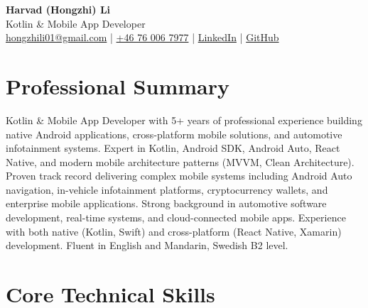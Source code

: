 \documentclass[11pt,a4paper]{article}
\begin{document}
\pagestyle{empty}

\begin{center}
{\LARGE \textbf{Harvad (Hongzhi) Li}}\\[10pt]
{\Large Kotlin \& Mobile App Developer}\\[10pt]
\textcolor{linkedinblue}{\href{mailto:hongzhili01@gmail.com}{hongzhili01@gmail.com} | \href{tel:+46760067977}{+46 76 006 7977} | \href{https://www.linkedin.com/in/harvad/}{LinkedIn} | \href{https://github.com/bluehawana}{GitHub}}
\end{center}

\section*{Professional Summary}

Kotlin \& Mobile App Developer with 5+ years of professional experience building native Android applications, cross-platform mobile solutions, and automotive infotainment systems. Expert in Kotlin, Android SDK, Android Auto, React Native, and modern mobile architecture patterns (MVVM, Clean Architecture). Proven track record delivering complex mobile systems including Android Auto navigation, in-vehicle infotainment platforms, cryptocurrency wallets, and enterprise mobile applications. Strong background in automotive software development, real-time systems, and cloud-connected mobile apps. Experience with both native (Kotlin, Swift) and cross-platform (React Native, Xamarin) development. Fluent in English and Mandarin, Swedish B2 level.

\section*{Core Technical Skills}
\end{document}
